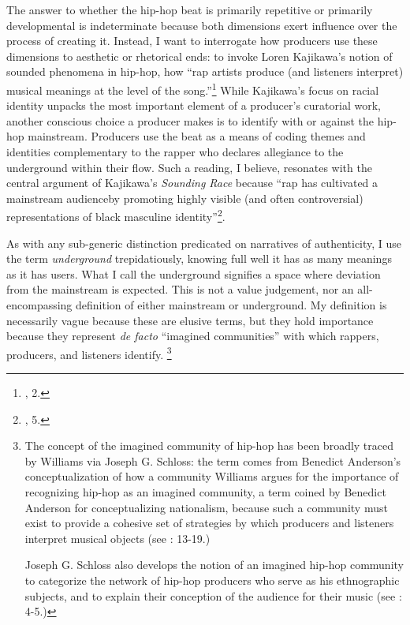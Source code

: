 The answer to whether the hip-hop beat is primarily repetitive or primarily developmental is indeterminate because both dimensions exert influence over the process of creating it. Instead, I want to interrogate how producers use these dimensions to aesthetic or rhetorical ends: to invoke Loren Kajikawa's notion of sounded phenomena in hip-hop, how ``rap artists produce (and listeners interpret) musical meanings at the level of the song.''\footnote{\cite{lorenkajikawaSoundingRaceRap2015}, 2.} While Kajikawa's focus on racial identity unpacks the most important element of a producer's  curatorial work, another conscious choice a producer makes is to identify with or against the hip-hop mainstream. Producers use the beat as a means of coding themes and identities complementary to the rapper who declares allegiance to the underground within their flow. Such a reading, I believe, resonates with the central argument of Kajikawa's \textit{Sounding Race} because ``rap has cultivated a mainstream audience\textellipsis by promoting highly visible (and often controversial) representations of black masculine identity''\footnote{\cite{lorenkajikawaSoundingRaceRap2015}, 5.}.

As with any sub-generic distinction predicated on narratives of authenticity, I use the term \emph{underground} trepidatiously, knowing full well it has as many meanings as it has users. What I call the underground signifies a space where deviation from the mainstream is expected. This is not a value judgement, nor an all-encompassing definition of either mainstream or underground. My definition is necessarily vague because these are elusive terms, but they hold importance because they represent \textit{de facto} ``imagined communities'' with which rappers, producers, and listeners identify.
\footnote{The concept of the imagined community of hip-hop has been broadly traced by Williams via Joseph G. Schloss: the term comes from Benedict Anderson's conceptualization of how a community Williams argues for the importance of recognizing hip-hop as an imagined community, a term coined by Benedict Anderson for conceptualizing nationalism, because such a community must exist to provide a cohesive set of strategies by which producers and listeners interpret musical objects (see \cite{justinawilliamsRhyminStealinMusical2013}: 13-19.) 

Joseph G. Schloss also develops the notion of an imagined hip-hop community to categorize the network of hip-hop producers who serve as his ethnographic subjects, and to explain their conception of the audience for their music (see \cite{josephgschlossMakingBeatsArt2004}: 4-5.)}

